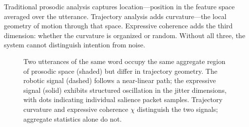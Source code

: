 \documentclass[12pt, a4paper]{article}
\begin{document}
\noindent Traditional prosodic analysis captures location---position in the feature space averaged over the utterance. Trajectory analysis adds curvature---the local geometry of motion through that space. Expressive coherence adds the third dimension: whether the curvature is organized or random. Without all three, the system cannot distinguish intention from noise.

\begin{figure}[h]
\centering
{}
\caption{Two utterances of the same word occupy the same aggregate region of prosodic space (shaded) but differ in trajectory geometry. The robotic signal (dashed) follows a near-linear path; the expressive signal (solid) exhibits structured oscillation in the jitter dimensions, with dots indicating individual salience packet samples. Trajectory curvature and expressive coherence $\chi$ distinguish the two signals; aggregate statistics alone do not.}
\label{fig:trajectory_geometry}
\end{figure}
\end{document}
